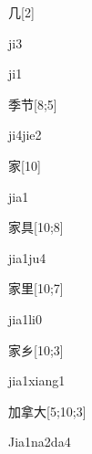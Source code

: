 \begin{verbete}[ji3]{几}[2]
\begin{pronuncia}{ji3}
\end{pronuncia}
\begin{pronuncia}{ji1}
\end{pronuncia}
\end{verbete}

\begin{verbete}[ji4jie2]{季节}[8;5]
\begin{pronuncia}{ji4jie2}
\end{pronuncia}
\end{verbete}

\begin{verbete}[jia1]{家}[10]
\begin{pronuncia}{jia1}
\end{pronuncia}
\end{verbete}

\begin{verbete}[jia1ju4]{家具}[10;8]
\begin{pronuncia}{jia1ju4}
\end{pronuncia}
\end{verbete}

\begin{verbete}[jia1li0]{家里}[10;7]
\begin{pronuncia}{jia1li0}
\end{pronuncia}
\end{verbete}

\begin{verbete}{家乡}[10;3]
\begin{pronuncia}{jia1xiang1}
\end{pronuncia}
\end{verbete}

\begin{verbete}[Jia1na2da4]{加拿大}[5;10;3]
\begin{pronuncia}{Jia1na2da4}
\end{pronuncia}
\end{verbete}

